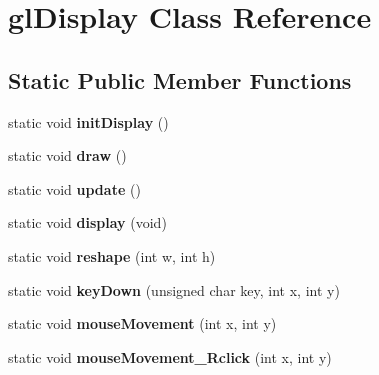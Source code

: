 \hypertarget{classglDisplay}{}\section{gl\+Display Class Reference}
\label{classglDisplay}
\subsection*{Static Public Member Functions}
\begin{DoxyCompactItemize}
\item 
static void {\bfseries init\+Display} ()\hypertarget{classglDisplay_a8b4bc6f22b21bedb0704141e33912b34}{}\label{classglDisplay_a8b4bc6f22b21bedb0704141e33912b34}

\item 
static void {\bfseries draw} ()\hypertarget{classglDisplay_ac8254a0aa0bb5d9e14dede933da9e5ce}{}\label{classglDisplay_ac8254a0aa0bb5d9e14dede933da9e5ce}

\item 
static void {\bfseries update} ()\hypertarget{classglDisplay_a99d827e4698a4bdd5d66401636551d53}{}\label{classglDisplay_a99d827e4698a4bdd5d66401636551d53}

\item 
static void {\bfseries display} (void)\hypertarget{classglDisplay_a5f1a27cfb9e4b15de87684c9c8177357}{}\label{classglDisplay_a5f1a27cfb9e4b15de87684c9c8177357}

\item 
static void {\bfseries reshape} (int w, int h)\hypertarget{classglDisplay_a44e36fb98ab4082166c0a25a8ebf9849}{}\label{classglDisplay_a44e36fb98ab4082166c0a25a8ebf9849}

\item 
static void {\bfseries key\+Down} (unsigned char key, int x, int y)\hypertarget{classglDisplay_a2d4cb39500e92f60e91abb3697c14939}{}\label{classglDisplay_a2d4cb39500e92f60e91abb3697c14939}

\item 
static void {\bfseries mouse\+Movement} (int x, int y)\hypertarget{classglDisplay_a28a5858df1ed510855fd64efb63eba7b}{}\label{classglDisplay_a28a5858df1ed510855fd64efb63eba7b}

\item 
static void {\bfseries mouse\+Movement\+\_\+\+Rclick} (int x, int y)\hypertarget{classglDisplay_a73971b52a594b5ed55c9c25f192f80cb}{}\label{classglDisplay_a73971b52a594b5ed55c9c25f192f80cb}


\end{DoxyCompactItemize}
